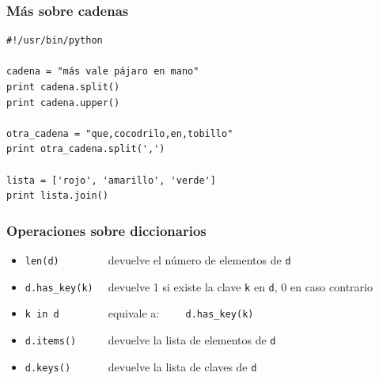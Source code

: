 \documentclass{beamer}
\begin{document}
\begin{frame}[fragile]

\frametitle{Más sobre cadenas}  

  \begin{footnotesize}
\begin{verbatim}
#!/usr/bin/python

cadena = "más vale pájaro en mano"
print cadena.split()
print cadena.upper()

otra_cadena = "que,cocodrilo,en,tobillo"
print otra_cadena.split(',')

lista = ['rojo', 'amarillo', 'verde']
print lista.join()

\end{verbatim}
  \end{footnotesize}



  
\end{frame}

\begin{frame}[fragile]
\frametitle{Operaciones sobre diccionarios}

\begin{footnotesize}
  \begin{itemize}
  \item \verb|len(d)        | devuelve el número de elementos de \verb|d|
  \item \verb|d.has_key(k)  | devuelve 1 si existe la clave \verb|k| en
    \verb|d|, 0 en caso contrario
  \item \verb|k in d        | equivale a: \verb|    d.has_key(k)|
  \item \verb|d.items()     | devuelve la lista de elementos de \verb|d|
  \item \verb|d.keys()      | devuelve la lista de claves de \verb|d|
  \end{itemize}
\end{footnotesize}
\end{frame}





\end{document}
